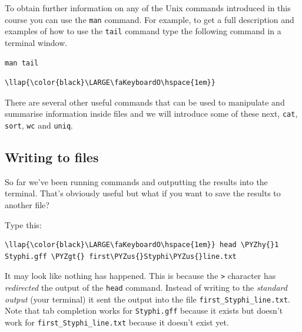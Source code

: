 \documentclass[11pt]{article}
\def\PYZus{\char`\_}
\def\PYZgt{\char`\>}
\def\PYZhy{\char`\-}
\begin{document}
To obtain further information on any of the Unix commands introduced in
this course you can use the \texttt{man} command. For example, to get a
full description and examples of how to use the \texttt{tail} command
type the following command in a terminal window.

\begin{verbatim}
man tail
\end{verbatim}

\begin{terminalinput}
\begin{Verbatim}[commandchars=\\\{\}]
\llap{\color{black}\LARGE\faKeyboardO\hspace{1em}}
\end{Verbatim}
\end{terminalinput}

    There are several other useful commands that can be used to manipulate
and summarise information inside files and we will introduce some of
these next, \texttt{cat}, \texttt{sort}, \texttt{wc} and \texttt{uniq}.

    \hypertarget{writing-to-files}{%
\subsection{Writing to files}\label{writing-to-files}}

So far we've been running commands and outputting the results into the
terminal. That's obviously useful but what if you want to save the
results to another file?

Type this:

\begin{terminalinput}
\begin{Verbatim}[commandchars=\\\{\}]
\llap{\color{black}\LARGE\faKeyboardO\hspace{1em}} head \PYZhy{}1 Styphi.gff \PYZgt{} first\PYZus{}Styphi\PYZus{}line.txt
\end{Verbatim}
\end{terminalinput}

    It may look like nothing has happened. This is because the
\texttt{\textgreater{}} character has \textit{redirected} the output of
the \texttt{head} command. Instead of writing to the \textit{standard
output} (your terminal) it sent the output into the file
\texttt{first\_Styphi\_line.txt}. Note that tab completion works for
\texttt{Styphi.gff} because it exists but doesn't work for
\texttt{first\_Styphi\_line.txt} because it doesn't exist yet.
\end{document}
